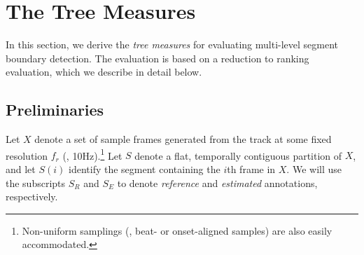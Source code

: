 \documentclass{article}
\begin{document}


\section{The Tree Measures}\label{sec:eval_desc}
\sloppy
In this section, we derive the \emph{tree measures} for evaluating multi-level segment boundary detection.
The evaluation is based on a reduction to ranking evaluation, which we describe in detail below.

\subsection{Preliminaries}


Let $X$ denote a set of sample frames generated from the track at some fixed resolution $f_r$ (\eg,
10Hz).\footnote{Non-uniform samplings (\eg, beat- or onset-aligned samples) are also easily accommodated.}
Let $S $ denote a flat, temporally contiguous partition of $X$,
and let $S(i)$ identify the segment containing the $i$th frame in $X$.
We will use the subscripts $S_R$ and $S_E$ to denote \emph{reference} and \emph{estimated} annotations, respectively.
\end{document}
